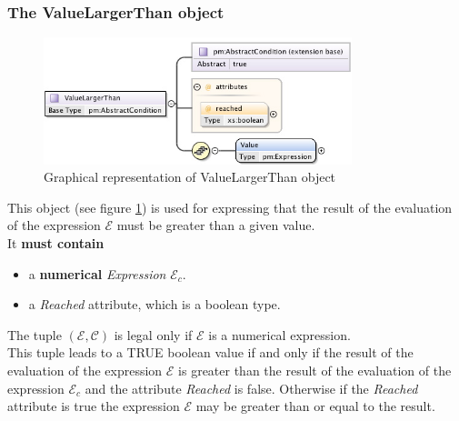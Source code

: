 \documentclass[a4paper,11pt] {ivoa}
\begin{document}
\subsubsection{The ValueLargerThan object}
\begin{figure}[htbp]
\begin{center}
\includegraphics[width=0.8\textwidth]{pictures/ValueLargerThan.jpg} 
\caption{Graphical representation of ValueLargerThan object}
\label{Pic-ValueLargerThan}
\end{center}
\end{figure}
This object (see figure \ref{Pic-ValueLargerThan}) is used for expressing that the result of the
evaluation of the expression $\mathcal E$ must be greater than a given value.\\
It {\bf must contain}
\begin{itemize}
\item a {\bf numerical} {\it Expression} $\mathcal E_c$. 
\item a {\it Reached} attribute, which is a boolean type.
\end{itemize}
The tuple $(\mathcal E, \mathcal C)$ is legal only if $\mathcal E$ is a numerical expression.\\
This tuple leads to a TRUE boolean value if and only if the result of the evaluation of the
expression $\mathcal E$ is greater than the result of the evaluation
of the expression $\mathcal E_c$ and the attribute {\it Reached} is false. Otherwise if the {\it
Reached} attribute is true the expression $\mathcal E$ may be greater than or equal to the result.
\end{document}
